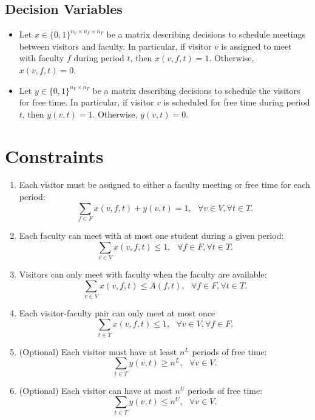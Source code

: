 \documentclass[12pt]{article}
\theoremstyle{definition}
\newtheorem{definition set}{Definition Set}%
\newtheorem{problem statement}{Problem Statement} %
\theoremstyle{remark}
\theoremstyle{remark}
\begin{document}
\subsection{Decision Variables}
\begin{itemize}
\item
Let $x \in \{0,1\}^{n_V \times n_F \times n_T}$ be a matrix describing decisions to schedule meetings between visitors and faculty.
In particular, if visitor $v$ is assigned to meet with faculty $f$ during period $t$, then $x(v,f,t) = 1$.
Otherwise, $x(v,f,t) = 0$.

\item
Let $y \in \{0,1\}^{n_V \times n_T}$ be a matrix describing decisions to schedule the visitors for free time.
In particular, if visitor $v$ is scheduled for free time during period $t$, then $y(v,t) = 1$.
Otherwise, $y(v,t) = 0$.
\end{itemize}

\section{Constraints}
\begin{enumerate}
\item
Each visitor must be assigned to either a faculty meeting or free time for each period:
\begin{equation}
\sum_{f \in F} x(v,f,t) + y(v,t) = 1, \ \ \ \forall v \in V, \forall t \in T.
\end{equation}

\item
Each faculty can meet with at most one student during a given period:
\begin{equation}
\sum_{v \in V} x(v,f,t) \leq 1, \ \ \ \forall f \in F, \forall t \in T.
\end{equation}

\item
Visitors can only meet with faculty when the faculty are available:
\begin{equation}
\sum_{v \in V} x(v,f,t) \leq A(f,t), \ \ \ \forall f \in F, \forall t \in T.
\end{equation}

\item
Each visitor-faculty pair can only meet at most once
\begin{equation}
\sum_{t \in T} x(v,f,t) \leq 1, \ \ \ \forall v \in V, \forall f \in F.
\end{equation}

\item (Optional) Each visitor must have at least $n^L$ periods of free time:
\begin{equation}
\sum_{t \in T} y(v,t) \geq n^L, \ \ \ \forall v \in V.
\end{equation}

\item (Optional) Each visitor can have at most $n^U$ periods of free time:
\begin{equation}
\sum_{t \in T} y(v,t) \leq n^U, \ \ \ \forall v \in V.
\end{equation}
\end{enumerate}
\end{document}

